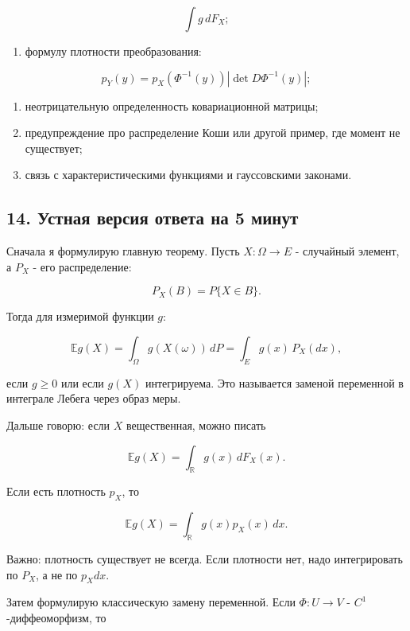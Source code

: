 \documentclass[
  11pt,
  a4paper,
]{article}
\providecommand{\tightlist}{%
  \setlength{\itemsep}{0pt}\setlength{\parskip}{0pt}}
\begin{document}
\[
\int g\,dF_X;
\]

\begin{enumerate}
\def\labelenumi{\arabic{enumi}.}
\setcounter{enumi}{2}
\tightlist
\item
  формулу плотности преобразования:
\end{enumerate}

\[
p_Y(y)=p_X(\Phi^{-1}(y))|\det D\Phi^{-1}(y)|;
\]

\begin{enumerate}
\def\labelenumi{\arabic{enumi}.}
\setcounter{enumi}{3}
\tightlist
\item
  неотрицательную определенность ковариационной матрицы;
\item
  предупреждение про распределение Коши или другой пример, где момент не
  существует;
\item
  связь с характеристическими функциями и гауссовскими законами.
\end{enumerate}

\subsection{14. Устная версия ответа на 5
минут}\label{ux443ux441ux442ux43dux430ux44f-ux432ux435ux440ux441ux438ux44f-ux43eux442ux432ux435ux442ux430-ux43dux430-5-ux43cux438ux43dux443ux442}

Сначала я формулирую главную теорему. Пусть \(X:\Omega\to E\) -
случайный элемент, а \(P_X\) - его распределение:

\[
P_X(B)=P\{X\in B\}.
\]

Тогда для измеримой функции \(g\):

\[
\mathbb E g(X)
=
\int_\Omega g(X(\omega))\,dP
=
\int_E g(x)\,P_X(dx),
\]

если \(g\ge0\) или если \(g(X)\) интегрируема. Это называется заменой
переменной в интеграле Лебега через образ меры.

Дальше говорю: если \(X\) вещественная, можно писать

\[
\mathbb E g(X)=\int_{\mathbb R} g(x)\,dF_X(x).
\]

Если есть плотность \(p_X\), то

\[
\mathbb E g(X)=\int_{\mathbb R} g(x)p_X(x)\,dx.
\]

Важно: плотность существует не всегда. Если плотности нет, надо
интегрировать по \(P_X\), а не по \(p_Xdx\).

Затем формулирую классическую замену переменной. Если \(\Phi:U\to V\) -
\(C^1\)-диффеоморфизм, то
\end{document}
